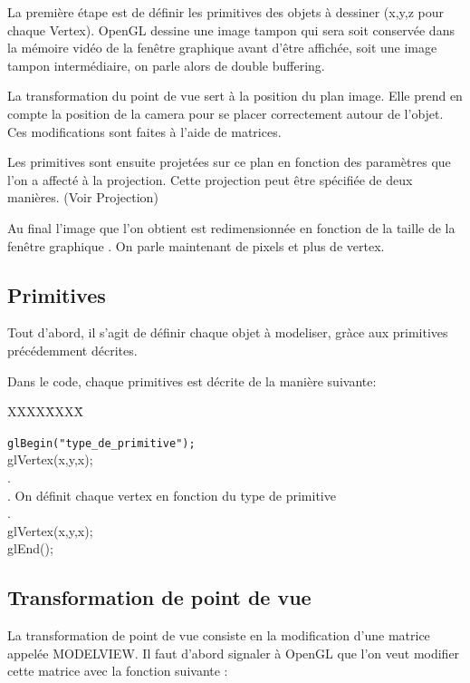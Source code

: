 La première étape est de définir les primitives des objets à dessiner (x,y,z pour chaque Vertex).
OpenGL dessine une image tampon qui sera soit conservée dans la mémoire vidéo de la fenêtre graphique avant d’être affichée, soit une image tampon intermédiaire, on parle alors de double buffering.

La transformation du point de vue sert à la position du plan image. Elle prend en compte la position de la camera pour se placer correctement autour de l'objet. Ces modifications sont faites à l'aide de matrices. 

Les primitives sont ensuite projetées sur ce plan en fonction des paramètres que l’on a affecté à la projection. Cette projection peut être spécifiée de deux manières. (Voir Projection)

Au final l’image que l’on obtient est redimensionnée en fonction de la taille de la fenêtre graphique . On parle maintenant de pixels et plus de vertex.
\newpage

\subsection{Primitives}
Tout d'abord, il s'agit de définir chaque objet à modeliser, gràce aux primitives précédemment décrites.

Dans le code, chaque primitives est décrite de la manière suivante:


\begin{tabbing}
XXXX\=XXXX\= \kill

\> \verb|glBegin("type_de_primitive");| \\
\> \> glVertex(x,y,x);\\
\> \> . \\
\> \> . On définit chaque vertex en fonction du type de primitive\\
\> \> . \\
\> \> glVertex(x,y,x);\\
\> glEnd();
\end{tabbing}

\subsection{Transformation de point de vue}
La transformation de point de vue consiste en la modification d'une matrice appelée MODELVIEW. Il faut d'abord signaler à OpenGL que l'on veut modifier cette matrice avec la fonction suivante :

